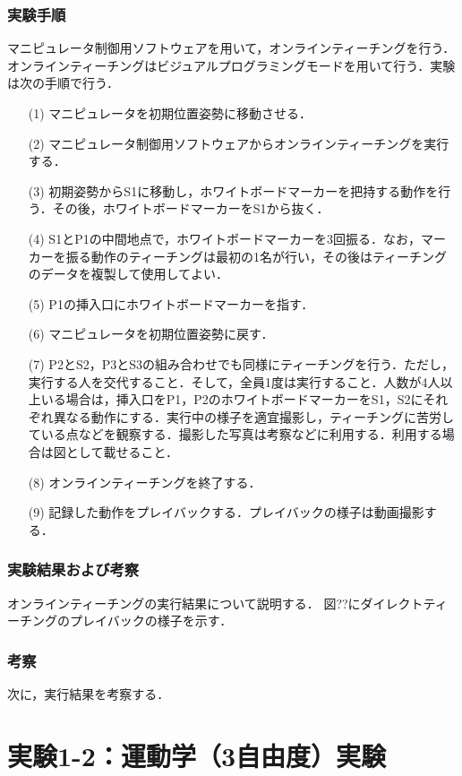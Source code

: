 \subsubsection{実験手順}
マニピュレータ制御用ソフトウェアを用いて，オンラインティーチングを行う．
オンラインティーチングはビジュアルプログラミングモードを用いて行う．実験は次の手順で行う．

\begin{enumerate}
  \item[(1)] マニピュレータを初期位置姿勢に移動させる．
  \item[(2)] マニピュレータ制御用ソフトウェアからオンラインティーチングを実行する．
  \item[(3)] 初期姿勢からS1に移動し，ホワイトボードマーカーを把持する動作を行う．その後，ホワイトボードマーカーをS1から抜く．
  \item[(4)] S1とP1の中間地点で，ホワイトボードマーカーを3回振る．なお，マーカーを振る動作のティーチングは最初の1名が行い，その後はティーチングのデータを複製して使用してよい．
  \item[(5)] P1の挿入口にホワイトボードマーカーを指す．
  \item[(6)] マニピュレータを初期位置姿勢に戻す．
  \item[(7)] P2とS2，P3とS3の組み合わせでも同様にティーチングを行う．ただし，実行する人を交代すること．そして，全員1度は実行すること．人数が4人以上いる場合は，挿入口をP1，P2のホワイトボードマーカーをS1，S2にそれぞれ異なる動作にする．実行中の様子を適宜撮影し，ティーチングに苦労している点などを観察する．撮影した写真は考察などに利用する．利用する場合は図として載せること．
  \item[(8)] オンラインティーチングを終了する．
  \item[(9)] 記録した動作をプレイバックする．プレイバックの様子は動画撮影する．
\end{enumerate}

\subsubsection{実験結果および考察}
オンラインティーチングの実行結果について説明する．
図??にダイレクトティーチングのプレイバックの様子を示す．

\subsubsection{考察}
次に，実行結果を考察する．


\section{実験1-2：運動学（3自由度）実験}


